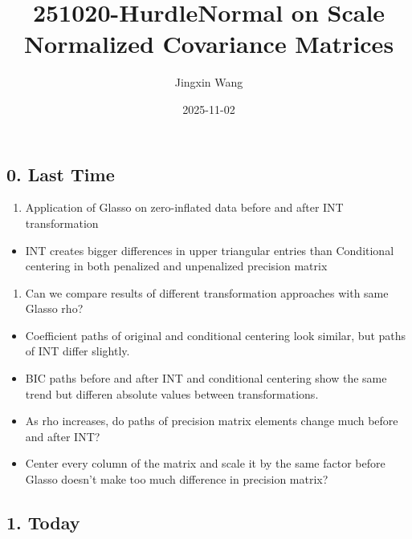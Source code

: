 \documentclass[
]{article}
\title{251020-HurdleNormal on Scale Normalized Covariance Matrices}
\author{Jingxin Wang}
\date{2025-11-02}
\providecommand{\tightlist}{%
  \setlength{\itemsep}{0pt}\setlength{\parskip}{0pt}}
\begin{document}
\maketitle

\hypertarget{last-time}{%
\subsection{0. Last Time}\label{last-time}}

\begin{enumerate}
\def\labelenumi{\arabic{enumi}.}
\tightlist
\item
  Application of Glasso on zero-inflated data before and after INT
  transformation
\end{enumerate}

\begin{itemize}
\tightlist
\item
  INT creates bigger differences in upper triangular entries than
  Conditional centering in both penalized and unpenalized precision
  matrix
\end{itemize}

\begin{enumerate}
\def\labelenumi{\arabic{enumi}.}
\setcounter{enumi}{1}
\tightlist
\item
  Can we compare results of different transformation approaches with
  same Glasso rho?\\
\end{enumerate}

\begin{itemize}
\tightlist
\item
  Coefficient paths of original and conditional centering look similar,
  but paths of INT differ slightly.
\item
  BIC paths before and after INT and conditional centering show the same
  trend but differen absolute values between transformations.
\item
  As rho increases, do paths of precision matrix elements change much
  before and after INT?\\
\item
  Center every column of the matrix and scale it by the same factor
  before Glasso doesn't make too much difference in precision matrix?
\end{itemize}

\hypertarget{today}{%
\subsection{1. Today}\label{today}}
\end{document}
